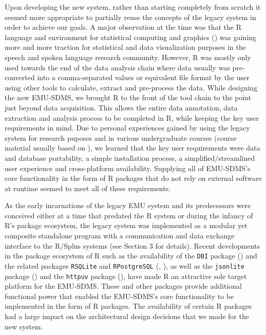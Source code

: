 \documentclass[]{book}
\begin{document}
Upon developing the new system, rather than starting completely from scratch it seemed more appropriate to partially reuse the concepts of the legacy system in order to achieve our goals. A major observation at the time was that the R language and environment for statistical computing and graphics (\citet{r-core-team:2016a}) was gaining more and more traction for statistical and data visualization purposes in the speech and spoken language research community. However, R was mostly only used towards the end of the data analysis chain where data usually was pre-converted into a comma-separated values or equivalent file format by the user using other tools to calculate, extract and pre-process the data. While designing the new EMU-SDMS, we brought R to the front of the tool chain to the point just beyond data acquisition. This allows the entire data annotation, data extraction and analysis process to be completed in R, while keeping the key user requirements in mind. Due to personal experiences gained by using the legacy system for research puposes and in various undergraduate courses (course material usually based on \citet{harrington:2010a}), we learned that the key user requirements were data and database portability, a simple installation process, a simplified/streamlined user experience and cross-platform availability. Supplying all of EMU-SDMS's core functionality in the form of R packages that do not rely on external software at runtime seemed to meet all of these requirements.

As the early incarnations of the legacy EMU system and its predecessors were conceived either at a time that predated the R system or during the infancy of R's package ecosystem, the legacy system was implemented as a modular yet composite standalone program with a communication and data exchange interface to the R/Splus systems (see \citet{cassidy:sc2001a} Section 3 for details). Recent developments in the package ecosystem of R such as the availability of the \texttt{DBI} package (\citet{r-special-interest-group-on-databases-r-sig-db:2016a}) and the related packages \texttt{RSQLite} and \texttt{RPostgreSQL} (\citet{wickham:2014a}, \citet{conway:2016a}), as well as the \texttt{jsonlite} package (\citet{ooms:as2014a}) and the \texttt{httpuv} package (\citet{rstudio:2015a}), have made R an attractive sole target platform for the EMU-SDMS. These and other packages provide additional functional power that enabled the EMU-SDMS's core functionality to be implemented in the form of R packages. The availability of certain R packages had a large impact on the architectural design decisions that we made for the new system.
\end{document}
